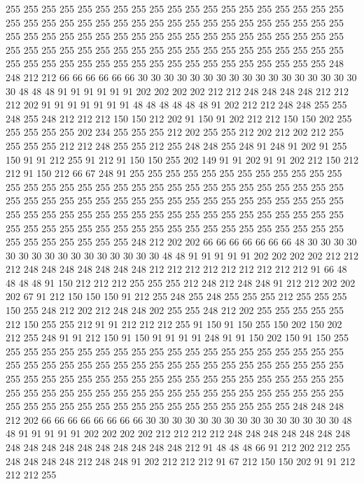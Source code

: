 255 255 255 255 255 255 255 255 255 255 255 255 255 255 255 255 255 255 255 255
255 255 255 255 255 255 255 255 255 255 255 255 255 255 255 255 255 255 255 255
255 255 255 255 255 255 255 255 255 255 255 255 255 255 255 255 255 255 255 255
255 255 255 255 255 255 255 255 255 255 255 255 255 255 255 255 255 255 255 255
255 255 255 255 255 255 255 255 255 255 255 255 255 255 248 248 212 212 66 66
66 66 66 66 30 30 30 30 30 30 30 30 30 30 30 30 30 30 30 30
30 30 48 48 48 91 91 91 91 91 91 202 202 202 202 212 212 248 248 248
248 212 212 212 202 91 91 91 91 91 91 91 48 48 48 48 48 48 91 202
212 212 248 248 255 255 248 255 248 212 212 212 150 150 212 202 91 150 91 202
212 212 150 150 202 255 255 255 255 255 202 234 255 255 255 212 202 255 255 212
202 212 202 212 255 255 255 255 212 212 248 255 255 212 255 248 248 255 248 91
248 91 202 91 255 150 91 91 212 255 91 212 91 150 150 255 202 149 91 91
202 91 91 202 212 150 212 212 91 150 212 66 67 248 91 255 255 255 255 255
255 255 255 255 255 255 255 255 255 255 255 255 255 255 255 255 255 255 255 255
255 255 255 255 255 255 255 255 255 255 255 255 255 255 255 255 255 255 255 255
255 255 255 255 255 255 255 255 255 255 255 255 255 255 255 255 255 255 255 255
255 255 255 255 255 255 255 255 255 255 255 255 255 255 255 255 255 255 255 255
255 255 255 255 255 255 255 255 255 255 248 212 202 202 66 66 66 66 66 66
66 48 30 30 30 30 30 30 30 30 30 30 30 30 30 30 30 30 48 48
91 91 91 91 91 202 202 202 202 212 212 212 248 248 248 248 248 248 248 212
212 212 212 212 212 212 212 212 91 66 48 48 48 48 91 150 212 212 212 255
255 255 212 248 212 248 248 91 212 212 202 202 202 67 91 212 150 150 150 91
212 255 248 255 248 255 255 255 212 255 255 255 150 255 248 212 202 212 248 248
202 255 255 248 212 202 255 255 255 255 255 212 150 255 255 212 91 91 212 212
212 255 91 150 91 150 255 150 202 150 202 212 255 248 91 91 212 150 91 150
91 91 91 91 248 91 91 150 202 150 91 150 255 255 255 255 255 255 255 255
255 255 255 255 255 255 255 255 255 255 255 255 255 255 255 255 255 255 255 255
255 255 255 255 255 255 255 255 255 255 255 255 255 255 255 255 255 255 255 255
255 255 255 255 255 255 255 255 255 255 255 255 255 255 255 255 255 255 255 255
255 255 255 255 255 255 255 255 255 255 255 255 255 255 255 255 255 255 255 255
255 255 255 255 255 248 248 248 212 202 66 66 66 66 66 66 66 66 30 30
30 30 30 30 30 30 30 30 30 30 30 30 30 48 48 91 91 91 91 91
202 202 202 202 212 212 212 212 248 248 248 248 248 248 248 248 248 248 248 248
248 248 248 248 248 212 91 48 48 48 66 91 212 202 212 255 248 248 248 248
212 248 248 91 202 212 212 212 91 67 212 150 150 202 91 91 212 212 212 255
